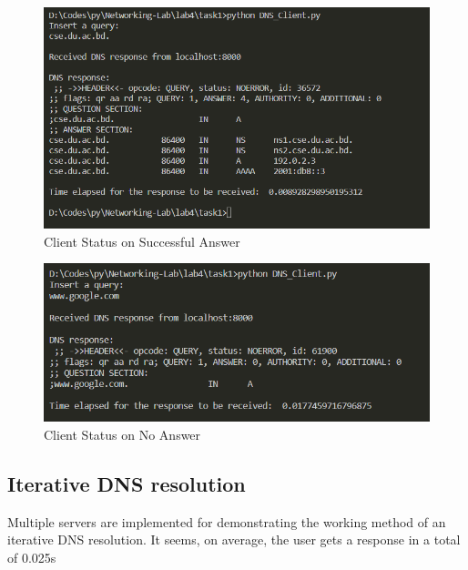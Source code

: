 \documentclass[11pt]{article}
\begin{document}
            \begin{figure}[!h]
                \centering
                \includegraphics*[width=\textwidth]{task1_client.png}
                \caption{Client Status on Successful Answer}
            \end{figure}

            \begin{figure}[!h]
                \centering
                \includegraphics*[width=\textwidth]{task1_client_uns.png}
                \caption{Client Status on No Answer}
            \end{figure}
        \FloatBarrier

    \subsection{Iterative DNS resolution}
    Multiple servers are implemented for demonstrating the working method of an iterative DNS resolution. It seems, on average,
    the user gets a response in a total of 0.025s
    
\end{document}
